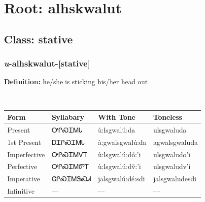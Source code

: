 \needspace{4in}
\section*{Root: alhskwalut}
\nopagebreak
{}
\needspace{3in}
\subsection*{Class: stative}
\nopagebreak
\needspace{2in}
\subsubsection*{\textit{u}{-}\textbf{alhskwalut}{-}[stative]}
\nopagebreak
\textbf{Definition: } he/she is sticking his/her head out
\\[0.5em]
\begin{tabularx}{\textwidth}{l X X X}%
\toprule%
\textbf{Form}&\textbf{Syllabary}&\textbf{With Tone}&\textbf{Toneless}\\%
\midrule%
Present&ᎤᎵᏍᏆᎷᏓ&ù:lsgwalú:da&ulsgwaluda\\%
1st Present&ᎠᏆᎵᏍᏆᎷᏓ&à:gwalsgwalú:da&agwalsgwaluda\\%
Imperfective&ᎤᎵᏍᏆᎷᏙᎢ&ù:lsgwalú:dó:’i&ulsgwaludo’i\\%
Perfective&ᎤᎵᏍᏆᎷᏛᎢ&ù:lsgwalú:dv̌:’i&ulsgwaludv’i\\%
Imperative&ᏣᎵᏍᏆᎷᏕᏍᏗ&jalsgwalú:dé:sdi&jalsgwaludesdi\\%
Infinitive&{-}{-}{-}&{-}{-}{-}&{-}{-}{-}\\%
\bottomrule%
\end{tabularx}
\\[1em]